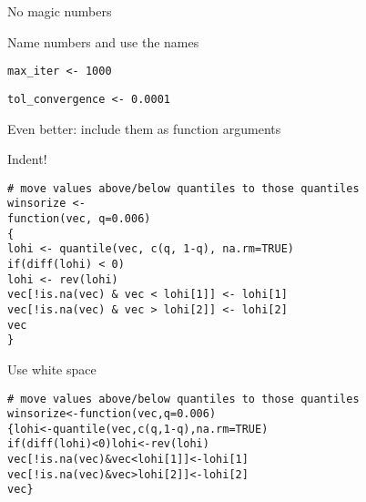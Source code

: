 \documentclass[12pt,t]{beamer}
\begin{document}
\begin{frame}{No magic numbers}

\bbi
\item Name numbers and use the names
  \bi
  \item[] {\tt max\_iter <- 1000}
  \item[] {\tt tol\_convergence <- 0.0001}
  \ei
\item {\hilit Even better}: include them as function arguments
\ei

\end{frame}



\begin{frame}[fragile,c]{Indent!}

\begin{lstlisting}
# move values above/below quantiles to those quantiles
winsorize <-
function(vec, q=0.006)
{
lohi <- quantile(vec, c(q, 1-q), na.rm=TRUE)
if(diff(lohi) < 0)
lohi <- rev(lohi)
vec[!is.na(vec) & vec < lohi[1]] <- lohi[1]
vec[!is.na(vec) & vec > lohi[2]] <- lohi[2]
vec
}
\end{lstlisting}

\end{frame}



\begin{frame}[fragile,c]{Use white space}

\begin{lstlisting}
# move values above/below quantiles to those quantiles
winsorize<-function(vec,q=0.006)
{lohi<-quantile(vec,c(q,1-q),na.rm=TRUE)
if(diff(lohi)<0)lohi<-rev(lohi)
vec[!is.na(vec)&vec<lohi[1]]<-lohi[1]
vec[!is.na(vec)&vec>lohi[2]]<-lohi[2]
vec}
\end{lstlisting}

\end{frame}
\end{document}
